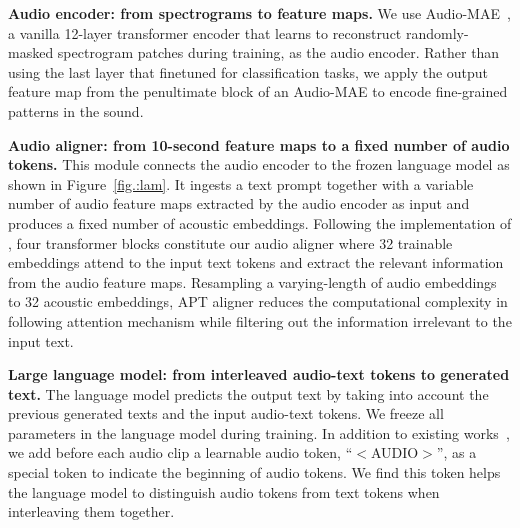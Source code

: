 \textbf{Audio encoder: from spectrograms to feature maps.} We use Audio-MAE~\citep{huang_masked_2022}, a vanilla 12-layer transformer encoder that learns to reconstruct randomly-masked spectrogram patches during training, as the audio encoder. Rather than using the last layer that finetuned for classification tasks, we apply the output feature map from the penultimate block of an Audio-MAE to encode fine-grained patterns in the sound.

\textbf{Audio aligner: from 10-second feature maps to a fixed number of audio tokens.} This module connects the audio encoder to the frozen language model as shown in Figure~\ref{fig.:lam}. It ingests a text prompt together with a variable number of audio feature maps extracted by the audio encoder as input and produces a fixed number of acoustic embeddings. Following the implementation of \citep{li_blip-2_2023}, four transformer blocks constitute our audio aligner where 32 trainable embeddings attend to the input text tokens and extract the relevant information from the audio feature maps. Resampling a varying-length of audio embeddings to 32 acoustic embeddings, APT aligner reduces the computational complexity in following attention mechanism while filtering out the information irrelevant to the input text. 

\textbf{Large language model: from interleaved audio-text tokens to generated text.} The language model predicts the output text by taking into account the previous generated texts and the input audio-text tokens. We freeze all parameters in the language model during training. In addition to existing works~\citep{li_blip-2_2023,gong_listen_2023}, we add before each audio clip a learnable audio token, ``$<$AUDIO$>$'', as a special token to indicate the beginning of audio tokens. We find this token helps the language model to distinguish audio tokens from text tokens when interleaving them together.

